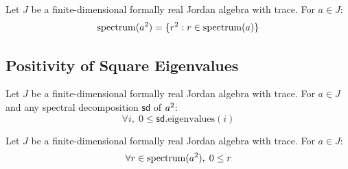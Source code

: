 \begin{theorem}[spectrum\_sq]
Let $J$ be a finite-dimensional formally real Jordan algebra with trace. For $a \in J$:
\[ \mathrm{spectrum}(a^{2}) = \{r^2 : r \in \mathrm{spectrum}(a)\} \]
\end{theorem}

\subsection{Positivity of Square Eigenvalues}

\begin{theorem}
Let $J$ be a finite-dimensional formally real Jordan algebra with trace. For $a \in J$ and any spectral decomposition $\mathsf{sd}$ of $a^{2}$:
\[ \forall i,\; 0 \le \mathsf{sd}.\mathrm{eigenvalues}(i) \]
\end{theorem}

\begin{theorem}
Let $J$ be a finite-dimensional formally real Jordan algebra with trace. For $a \in J$:
\[ \forall r \in \mathrm{spectrum}(a^{2}),\; 0 \le r \]
\end{theorem}
